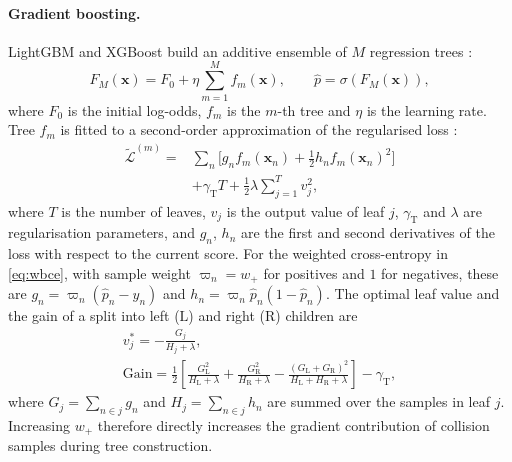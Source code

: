 \paragraph{Gradient boosting.}
LightGBM and XGBoost build an additive ensemble of $M$ regression trees \cite{friedman2001greedy}:
\begin{equation}
F_M(\mathbf{x}) = F_0 + \eta \sum_{m=1}^{M} f_m(\mathbf{x}), \qquad \hat{p} = \sigma\!\left(F_M(\mathbf{x})\right),
\label{eq:gbdt}
\end{equation}
where $F_0$ is the initial log-odds, $f_m$ is the $m$-th tree and $\eta$ is the learning rate. Tree $f_m$ is fitted to a second-order approximation of the regularised loss \cite{chen2016xgboost}:
\begin{equation}
\begin{split}
\tilde{\mathcal{L}}^{(m)} = {} & \sum_{n} \Big[ g_n f_m(\mathbf{x}_n) + \tfrac{1}{2} h_n f_m(\mathbf{x}_n)^2 \Big] \\
& + \gamma_{\text{T}} T + \tfrac{1}{2}\lambda \sum_{j=1}^{T} v_j^2,
\end{split}
\label{eq:gbdtobj}
\end{equation}
where $T$ is the number of leaves, $v_j$ is the output value of leaf $j$, $\gamma_{\text{T}}$ and $\lambda$ are regularisation parameters, and $g_n$, $h_n$ are the first and second derivatives of the loss with respect to the current score. For the weighted cross-entropy in \cref{eq:wbce}, with sample weight $\varpi_n = w_{+}$ for positives and $1$ for negatives, these are $g_n = \varpi_n(\hat{p}_n - y_n)$ and $h_n = \varpi_n\hat{p}_n(1-\hat{p}_n)$. The optimal leaf value and the gain of a split into left ($\mathrm{L}$) and right ($\mathrm{R}$) children are
\begin{equation}
\begin{gathered}
v_j^{*} = -\frac{G_j}{H_j + \lambda},\\
\mathrm{Gain} = \frac{1}{2}\left[\frac{G_{\mathrm{L}}^2}{H_{\mathrm{L}}+\lambda} + \frac{G_{\mathrm{R}}^2}{H_{\mathrm{R}}+\lambda} - \frac{(G_{\mathrm{L}}+G_{\mathrm{R}})^2}{H_{\mathrm{L}}+H_{\mathrm{R}}+\lambda}\right] - \gamma_{\text{T}},
\end{gathered}
\label{eq:leaf}
\end{equation}
where $G_j=\sum_{n \in j} g_n$ and $H_j=\sum_{n \in j} h_n$ are summed over the samples in leaf $j$. Increasing $w_{+}$ therefore directly increases the gradient contribution of collision samples during tree construction.

